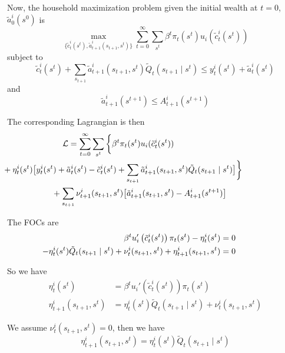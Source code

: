 \documentclass[twocolumn, fleqn]{article}
\numberwithin{equation}{section}
\begin{document}
	Now, the household maximization problem given the initial wealth at $t=0$, $\tilde a_0^i(s^0)$ is 
	\begin{equation}
		\max_{\{\tilde c_t^i(s^t), \tilde a_{t+1}^{i}(s_{t+1},s^t)\}} \sum_{t=0}^{\infty} \sum_{s^t} \beta^t \pi_t (s^t)u_i (\tilde c_t^i(s^t))
	\end{equation}
	subject to 
	\begin{equation}
		\tilde{c}_t^i(s^t) + \sum_{s_{t+1}} \tilde{a}_{t+1}^i(s_{t+1}, s^t) \tilde{Q}_t(s_{t+1}\mid s^t) 
		\leq y_t^i(s^t) + \tilde{a}_t^i(s^t)
	\end{equation}
	and 
	\begin{equation}
		 \tilde{a}_{t+1}^i(s^{t+1}) \leq A_{t+1}^i(s^{t+1})
	\end{equation}
	
	The corresponding Lagrangian is then 
	\begin{align*}
		\hspace{-6em} \mathcal L &= \sum_{t=0}^{\infty} \sum_{s^t} \bigg\{ \beta^t \pi_t (s^t)u_i (\tilde c_t^i(s^t)) \\
		&\hspace{-8em}+ \eta_t^i(s^t)\big[y_t^i(s^t) + \tilde{a}_t^i(s^t)
 	-  \tilde{c}_t^i(s^t) + \sum_{s_{t+1}} \tilde{a}_{t+1}^i(s_{t+1}, s^t) \tilde{Q}_t(s_{t+1}\mid s^t)\big] \bigg\}\\
 	&\hspace{-2em}+ \sum_{s_{t+1}} \nu_{t+1}^i(s_{t+1}, s^{t})\big[ \tilde{a}_{t+1}^i(s_{t+1}, s^{t})- A_{t+1}^i(s^{t+1})\big]
	\end{align*}
	
	The FOCs are
	\begin{align*}
		\hspace{-4em} \beta^t u_i'\left( \tilde{c}_t^i(s^t) \right) \pi_t(s^t) - \eta_t^i(s^t) &= 0\\
		\hspace{-4em} - \eta_t^i(s^t) \tilde{Q}_t(s_{t+1} \mid s^t) 
	+ \nu_t^i(s_{t+1}, s^{t}) + \eta_{t+1}^i(s_{t+1}, s^t) &= 0
	\end{align*}

	So we have 
	\begin{align}
		\eta_t^i(s^t) &=\beta^t u_i'\left( \tilde{c}_t^i(s^t) \right) \pi_t(s^t) \label{eq:sq_op1} \\
		\eta_{t+1}^i(s_{t+1}, s^t)&=\eta_t^i(s^t) \tilde{Q}_t(s_{t+1} \mid s^t) 
	+ \nu_t^i(s_{t+1}, s^{t})\label{eq:sq_op2} 
	\end{align}
	
	We assume $\nu_t^i(s_{t+1}, s^{t})=0$, then we have 
	\begin{equation}
		\eta_{t+1}^i(s_{t+1}, s^t) =\eta_t^i(s^t) \tilde{Q}_t(s_{t+1} \mid s^t)
	\end{equation}
	
\end{document}
